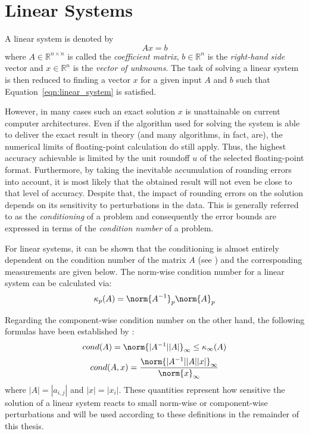 \section{Linear Systems}
\label{sec:linear_systems}

\noindent A linear system is denoted by
\begin{equation}
\label{eqn:linear_system}
    Ax=b
\end{equation}
\noindent where $A \in \mathbb{R}^{n \times n}$ is called the \textit{coefficient matrix}, $b \in \mathbb{R}^{n}$ is the \textit{right-hand side} vector and $x \in \mathbb{R}^{n}$ is the \textit{vector of unknowns}. The task of solving a linear system is then reduced to finding a vector $x$ for a given input $A$ and $b$ such that Equation~\hyperref[eqn:linear_system]{\ref{eqn:linear_system}} is satisfied.

However, in many cases such an exact solution $x$ is unattainable on current computer architectures. Even if the algorithm used for solving the system is able to deliver the exact result in theory (and many algorithms, in fact, are), the numerical limits of floating-point calculation do still apply. Thus, the highest accuracy achievable is limited by the unit roundoff $u$ of the selected floating-point format. Furthermore, by taking the inevitable accumulation of rounding errors into account, it is most likely that the obtained result will not even be close to that level of accuracy. Despite that, the impact of rounding errors on the solution depends on its sensitivity to perturbations in the data. This is generally referred to as the \textit{conditioning} of a problem and consequently the error bounds are expressed in terms of the \textit{condition number} of a problem.

For linear systems, it can be shown that the conditioning is almost entirely dependent on the condition number of the matrix $A$ (see \cite{higham_accuracy_2002}) and the corresponding measurements are given below. The norm-wise condition number for a linear system can be calculated via:
\begin{equation}
\kappa_{p}(A) = \norm{A^{-1}}_p\norm{A}_p
\end{equation}

\noindent Regarding the component-wise condition number on the other hand, the following formulas have been established by \cite{skeel_scaling_1979}:
\begin{equation}
cond(A) = \norm{|A^{-1}||A|}_\infty \leq \kappa_{\infty}(A)
\end{equation}
\begin{equation}
cond(A,x) = \frac{\norm{|A^{-1}||A||x|}_\infty}{\norm{x}_\infty}
\end{equation}
\noindent where $|A| = |a_{i,j}|$ and $|x| = |x_{i}|$. These quantities represent how sensitive the solution of a linear system reacts to small norm-wise or component-wise perturbations and will be used according to these definitions in the remainder of this thesis.
